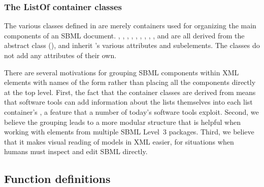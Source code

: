 \subsubsection{The ListOf container classes}
\label{sec:listof}
\label{sec:listofunitdefinitions}
\label{sec:listoffunctiondefinitions}
\label{sec:listofcompartments}
\label{sec:listofspecies}
\label{sec:listofparameters}
\label{sec:listofinitialassignments}
\label{sec:listofinitialassign}
\label{sec:listofrules}
\label{sec:listofconstraints}
\label{sec:listofreactions}
\label{sec:listofevents}

The various \ListOf classes defined in  are
merely containers used for organizing the main components of an
SBML document.  \ListOfFunctionDefinitions,
\ListOfUnitDefinitions, \ListOfCompartments, \ListOfSpecies,
\ListOfParameters, \ListOfInitialAssignments, \ListOfRules,
\ListOfConstraints, \ListOfReactions, and \ListOfEvents are all
derived from the abstract class \SBase (),
and inherit \SBase's various attributes and subelements.  The
\ListOf classes do not add any attributes of their own.

There are several motivations for grouping SBML components within
XML elements with names of the form 
rather than placing all the components directly at the top level.
First, the fact that the container classes are derived from \SBase
means that software tools can add information about the lists
themselves into each list container's \Annotation, a feature that
a number of today's software tools exploit.  Second, we believe
the grouping leads to a more modular structure that is helpful
when working with elements from multiple SBML Level~3 packages.
Third, we believe that it makes visual reading of models in XML
easier, for situations when humans must inspect and edit SBML
directly.



\subsection{Function definitions}
\label{sec:functiondefinition}

